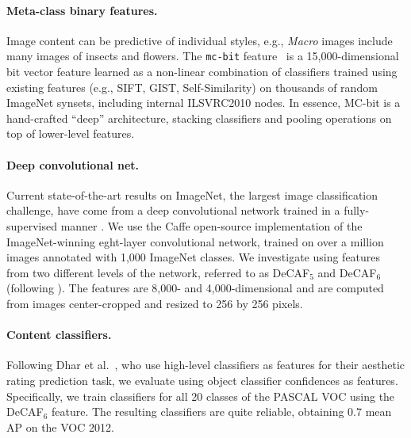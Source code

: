 \vspace{-1em}
\paragraph{Meta-class binary features.}
Image content can be predictive of individual styles, e.g., \emph{Macro} images include many images of insects and flowers. The \texttt{mc-bit} feature~\cite{Bergamo-CVPR-2012} is a 15,000-dimensional bit vector feature learned as a non-linear combination of classifiers trained using existing features (e.g., SIFT, GIST, Self-Similarity) on thousands of random ImageNet synsets, including internal ILSVRC2010 nodes.
In essence, MC-bit is a hand-crafted ``deep'' architecture, stacking classifiers and pooling operations on top of lower-level features.

\vspace{-1em}
\paragraph{Deep convolutional net.}
Current state-of-the-art results on ImageNet, the largest image classification challenge, have come from a deep convolutional network trained in a fully-supervised manner \cite{krizhevsky2012imagenet}.
We use the Caffe \cite{Jia13caffe} open-source implementation of the ImageNet-winning eght-layer convolutional network, trained on over a million images annotated with 1,000 ImageNet classes.
We investigate using features from two different levels of the network, referred to as DeCAF$_5$ and DeCAF$_6$ (following \cite{Donahue2013}).
The features are 8,000- and 4,000-dimensional and are computed from images center-cropped and resized to 256 by 256 pixels.

\vspace{-1em}
\paragraph{Content classifiers.}
Following Dhar et al.~\cite{Dhar-CVPR-2011}, who use high-level classifiers as features for their aesthetic rating prediction task, we evaluate using object classifier confidences as features.
Specifically, we train classifiers for all 20 classes of the PASCAL VOC \cite{pascal-voc-2010} using the DeCAF$_6$ feature.
The resulting classifiers are quite reliable, obtaining $0.7$ mean AP on the VOC 2012.

